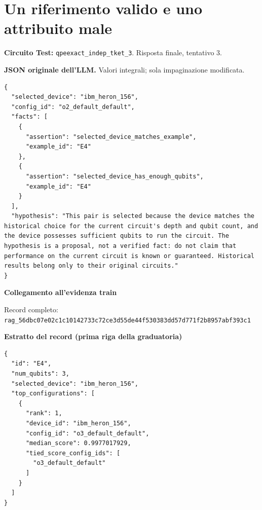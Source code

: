 \documentclass[a4paper,10pt]{article}
\begin{document}
\section*{Un riferimento valido e uno attribuito male}
\textbf{Circuito Test:} \texttt{qpeexact\_indep\_tket\_3}. Risposta finale, tentativo 3.\par
\textbf{JSON originale dell'LLM.} Valori integrali; sola impaginazione modificata.\par
\begin{lstlisting}
{
  "selected_device": "ibm_heron_156",
  "config_id": "o2_default_default",
  "facts": [
    {
      "assertion": "selected_device_matches_example",
      "example_id": "E4"
    },
    {
      "assertion": "selected_device_has_enough_qubits",
      "example_id": "E4"
    }
  ],
  "hypothesis": "This pair is selected because the device matches the historical choice for the current circuit's depth and qubit count, and the device possesses sufficient qubits to run the circuit. The hypothesis is a proposal, not a verified fact: do not claim that performance on the current circuit is known or guaranteed. Historical results belong only to their original circuits."
}
\end{lstlisting}

\textbf{Collegamento all'evidenza train}
\begin{center}\end{center}
{\footnotesize Record completo: \texttt{rag\_56dbc07e02c1c10142733c72ce3d55de44f530383dd57d771f2b8957abf393c1}}\par
\textbf{Estratto del record (prima riga della graduatoria)}
\begin{lstlisting}
{
  "id": "E4",
  "num_qubits": 3,
  "selected_device": "ibm_heron_156",
  "top_configurations": [
    {
      "rank": 1,
      "device_id": "ibm_heron_156",
      "config_id": "o3_default_default",
      "median_score": 0.9977017929,
      "tied_score_config_ids": [
        "o3_default_default"
      ]
    }
  ]
}
\end{lstlisting}
\end{document}
